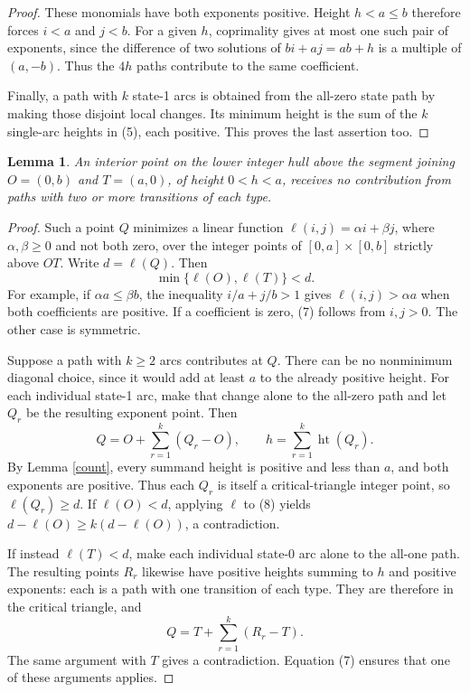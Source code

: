 \documentclass[11pt]{article}
\newtheorem{lemma}{Lemma}
\newcommand{\HH}{\operatorname{ht}}
\begin{document}
\begin{proof}
These monomials have both exponents positive. Height $h<a\leq b$
therefore forces $i<a$ and $j<b$. For a given $h$, coprimality
gives at most one such pair of exponents, since the difference of
two solutions of $bi+aj=ab+h$ is a multiple of $(a,-b)$.
Thus the $4h$ paths contribute to the same coefficient.

Finally, a path with $k$ state-1 arcs is obtained from the all-zero
state path by making those disjoint local changes. Its minimum
height is the sum of the $k$ single-arc heights in (5), each
positive. This proves the last assertion too.
\end{proof}

\begin{lemma}\label{sail}
An interior point on the lower integer hull above the segment
joining $O=(0,b)$ and $T=(a,0)$, of height $0<h<a$, receives
no contribution from paths with two or more transitions of each type.
\end{lemma}
\begin{proof}
Such a point $Q$ minimizes a linear function $\ell(i,j)=\alpha i+
\beta j$, where $\alpha,\beta\geq0$ and not both zero, over the
integer points of $[0,a]\times[0,b]$ strictly above $OT$.
Write $d=\ell(Q)$. Then
\[
 \min\{\ell(O),\ell(T)\}<d.
 \tag{7}
\]
For example, if $\alpha a\leq\beta b$, the inequality
$i/a+j/b>1$ gives $\ell(i,j)>\alpha a$ when both coefficients
are positive. If a coefficient is zero, (7) follows from $i,j>0$.
The other case is symmetric.

Suppose a path with $k\geq2$ arcs contributes at $Q$.
There can be no nonminimum diagonal choice, since it would add at
least $a$ to the already positive height. For each individual
state-1 arc, make that change alone to the all-zero path and let
$Q_r$ be the resulting exponent point. Then
\[
 Q=O+\sum_{r=1}^k(Q_r-O),\qquad
 h=\sum_{r=1}^k\HH(Q_r).
 \tag{8}
\]
By Lemma \ref{count}, every summand height is positive and less
than $a$, and both exponents are positive. Thus each $Q_r$ is
itself a critical-triangle integer point, so $\ell(Q_r)\geq d$.
If $\ell(O)<d$, applying $\ell$ to (8) yields
$d-\ell(O)\geq k(d-\ell(O))$, a contradiction.

If instead $\ell(T)<d$, make each individual state-0 arc alone
to the all-one path. The resulting points $R_r$ likewise have
positive heights summing to $h$ and positive exponents: each is
a path with one transition of each type. They are therefore in
the critical triangle, and
\[
 Q=T+\sum_{r=1}^k(R_r-T).
\]
The same argument with $T$ gives a contradiction. Equation (7)
ensures that one of these arguments applies.
\end{proof}
\end{document}
